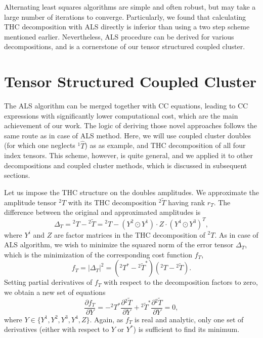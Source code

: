 Alternating least squares algorithms are simple and 
often robust,\cite{uschmajew2012local} but may take a large number of
iterations to converge.\cite{comon2009tensor} Particularly, we found that 
calculating THC decomposition with ALS directly is inferior than using a two 
step scheme mentioned earlier.\cite{schutski2017tensor} Nevertheless, ALS 
procedure can be derived for various decompositions, and is a cornerstone of 
our tensor structured coupled cluster.

\section{Tensor Structured Coupled Cluster}
The ALS algorithm can be merged together with CC equations, leading to
CC expressions with significantly lower computational cost, which are the main 
achievement of our work.\cite{schutski2017tensor} The logic of deriving those 
novel approaches follows the same route as in case of ALS method. Here, 
we will use coupled cluster doubles (for which one neglects ${}^1\hat{T}$) as as 
example, and THC decomposition of all four index tensors. This scheme, 
however, is quite general, and we applied it to other decompositions and 
coupled cluster methods, which is discussed in subsequent sections. 

Let us impose the THC structure on the doubles amplitudes. We
approximate the amplitude tensor ${}^{2}T$ with its THC decomposition
${}^{2}\tilde{T}$ having rank $r_{T}$.  The difference between the original and 
approximated amplitudes is
%
\begin{equation} 
\Delta_{T} = {}^{2}T - {}^{2}\tilde{T} = {}^{2}T -
(Y^{2} \odot Y^{1}) \cdot Z \cdot (Y^{4} \odot Y^{3})^{T},
\end{equation}
%
where $Y^{i}$ and $Z$ are factor matrices in the THC
decomposition of ${}^{2}T$. As in case of ALS algorithm, we wish to minimize 
the squared norm of the error tensor $\Delta_{T}$, which is the minimization of 
the corresponding cost function $f_{T}$,
%
\begin{equation}
f_{T} = |\Delta_{T}|^2 = ({}^{2}T^{\ast} -
{}^{2}\tilde{T}^{\ast})({}^{2}T - {}^{2}\tilde{T}).
\end{equation}
%
Setting partial derivatives of $f_{T}$ with respect to
the decomposition factors to zero, we obtain a new set of equations
%
\begin{equation} 
\frac{\partial f_{T}}{\partial Y} = - {}^{2}T^{\ast}
\frac{\partial {}^{2} \tilde{T}}{\partial Y} + {}^{2}\tilde{T}^{\ast}
\frac{\partial {}^{2} \tilde{T}}{\partial Y} = 0,
\label{eq:cc_cost_function}
\end{equation}
%
where $Y \in \{Y^{1}, Y^{2}, Y^{3}, Y^{4}, Z\}$. Again,
as $f_{T}$ is real and analytic, only one set of derivatives (either
with respect to $Y$ or $Y^{\ast}$) is sufficient to find its minimum.

